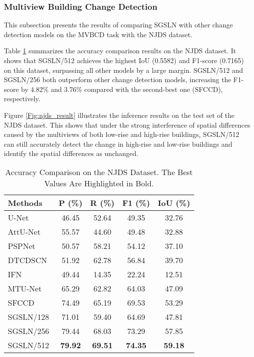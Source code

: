 \documentclass[journal]{IEEEtran}
\begin{document}
\subsubsection{Multiview Building Change Detection}
\label{section:4.4.4}

This subsection presents the results of comparing SGSLN with other change detection models on the MVBCD task with the NJDS dataset.

Table \ref{njds_result} summarizes the accuracy comparison results on the NJDS dataset. It shows that SGSLN/512 achieves the highest IoU (0.5582) and F1-score (0.7165) on this dataset, surpassing all other models by a large margin. SGSLN/512 and SGSLN/256 both outperform other change detection models, increasing the F1-score by 4.82\% and 3.76\% compared with the second-best one (SFCCD), respectively.

Figure \ref{Fig:njds_result} illustrates the inference results on the test set of the NJDS dataset. This shows that under the strong interference of spatial differences caused by the multiviews of both low-rise and high-rise buildings, SGSLN/512 can still accurately detect the change in high-rise and low-rise buildings and identify the spatial differences as unchanged.

\begin{table}[!ht]
\caption{Accuracy Comparison on the NJDS Dataset. The Best Values Are Highlighted in Bold.}
\label{njds_result}
\centering
\begin{tabular}{lcccc}
\toprule
Methods & P (\%) & R (\%) & F1 (\%) & IoU (\%) \\
\midrule
U-Net~\cite{unet} & 46.45 & 52.64 & 49.35 & 32.76 \\
AttU-Net~\cite{aunet} & 55.57 & 44.60 & 49.48 & 32.88 \\
PSPNet~\cite{psp} & 50.57 & 58.21 & 54.12 & 37.10 \\
DTCDSCN~\cite{dtcdstn} & 51.92 & 62.78 & 56.84 & 39.70 \\
IFN~\cite{dsifn} & 49.44 & 14.35 & 22.24 & 12.51 \\
MTU-Net~\cite{mtu} & 65.29 & 62.82 & 64.03 & 47.09 \\
SFCCD~\cite{njds} & 74.49 & 65.19 & 69.53 & 53.29 \\
SGSLN/128 & 71.01 & 59.40 & 64.69 & 47.81 \\
SGSLN/256 & 79.44 & 68.03 & 73.29 & 57.85 \\
SGSLN/512 & \textbf{79.92} & \textbf{69.51} & \textbf{74.35} & \textbf{59.18} \\
\bottomrule
\end{tabular}
\end{table}
\end{document}
